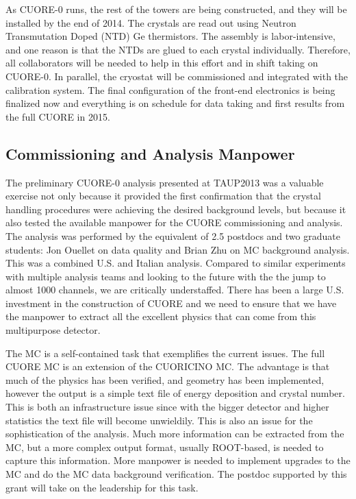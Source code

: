 As CUORE-0 runs, the rest of the towers are being constructed, and they will be installed by the end of 2014. The crystals are read out using Neutron Transmutation Doped (NTD) Ge thermistors. The assembly is labor-intensive, and one reason is that the NTDs are glued to each crystal individually. Therefore, all collaborators will be needed to help in this effort and in shift taking on CUORE-0. In parallel, the cryostat will be commissioned and integrated with the calibration system. The final configuration of the front-end electronics is being finalized now and everything is on schedule for data taking and first results from the full CUORE in 2015.

\subsection{Commissioning and Analysis Manpower}

The preliminary CUORE-0  analysis presented at TAUP2013 was a valuable exercise not only because it provided the first confirmation that the crystal handling procedures were achieving the desired background levels, but because it also tested the available manpower for the CUORE commissioning and analysis.  The analysis was performed by the equivalent of 2.5 postdocs and two graduate students: Jon Ouellet on data quality and Brian Zhu on MC background analysis. This was a combined U.S. and Italian analysis. Compared to similar experiments with multiple analysis teams and looking to the future with the the jump to almost 1000 channels, we are critically understaffed.  There has been a large U.S. investment in the construction of CUORE and we need to ensure that we have the manpower to extract all the excellent physics that can come from this multipurpose detector.

The MC is a self-contained task that exemplifies the current issues.  The full CUORE MC is an extension of the CUORICINO MC. The advantage is that much of the physics has been verified, and geometry has been implemented, however the output is a simple text file of energy deposition and crystal number. This is both an infrastructure issue since with the bigger detector and higher statistics the text file will become unwieldily.  This is also an issue for the sophistication of the analysis. Much more information can be extracted from the MC, but a more complex output format, usually ROOT-based,  is needed to capture this information. More manpower is needed to implement upgrades to the MC and do the MC data background verification. The postdoc supported by this grant will take on the leadership for this task.

